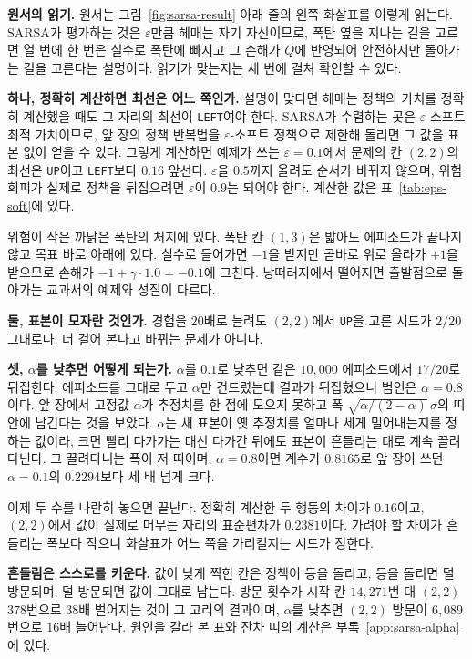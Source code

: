 \documentclass[11pt,a4paper]{article}
\begin{document}
\textbf{원서의 읽기.} 원서는 그림~\ref{fig:sarsa-result} 아래 줄의 왼쪽 화살표를 이렇게 읽는다.
SARSA가 평가하는 것은 $\varepsilon$만큼 헤매는 자기 자신이므로, 폭탄 옆을 지나는 길을 고르면 열 번에
한 번은 실수로 폭탄에 빠지고 그 손해가 $Q$에 반영되어 안전하지만 돌아가는 길을 고른다는 설명이다.
읽기가 맞는지는 세 번에 걸쳐 확인할 수 있다.

\textbf{하나, 정확히 계산하면 최선은 어느 쪽인가.} 설명이 맞다면 헤매는 정책의 가치를 정확히
계산했을 때도 그 자리의 최선이 \texttt{LEFT}여야 한다. SARSA가 수렴하는 곳은
$\varepsilon$-소프트 최적 가치이므로, 앞 장의 정책 반복법을 $\varepsilon$-소프트 정책으로 제한해
돌리면 그 값을 표본 없이 얻을 수 있다. 그렇게 계산하면 예제가 쓰는 $\varepsilon=0.1$에서 문제의 칸
$(2,2)$의 최선은 \texttt{UP}이고 \texttt{LEFT}보다 $0.16$ 앞선다. $\varepsilon$을 $0.5$까지 올려도
순서가 바뀌지 않으며, 위험 회피가 실제로 정책을 뒤집으려면 $\varepsilon$이 $0.9$는 되어야 한다.
계산한 값은 표~\ref{tab:eps-soft}에 있다.

위험이 작은 까닭은 폭탄의 처지에 있다. 폭탄 칸 $(1,3)$은 밟아도 에피소드가 끝나지 않고 목표 바로
아래에 있다. 실수로 들어가면 $-1$을 받지만 곧바로 위로 올라가 $+1$을 받으므로 손해가
$-1 + \gamma \cdot 1.0 = -0.1$에 그친다. 낭떠러지에서 떨어지면 출발점으로 돌아가는 교과서의 예제와
성질이 다르다.

\textbf{둘, 표본이 모자란 것인가.} 경험을 $20$배로 늘려도 $(2,2)$에서 \texttt{UP}을 고른 시드가
$2/20$ 그대로다. 더 걸어 본다고 바뀌는 문제가 아니다.

\textbf{셋, $\alpha$를 낮추면 어떻게 되는가.} $\alpha$를 $0.1$로 낮추면 같은 $10{,}000$
에피소드에서 $17/20$로 뒤집힌다. 에피소드를 그대로 두고 $\alpha$만 건드렸는데 결과가 뒤집혔으니
범인은 $\alpha=0.8$이다. 앞 장에서 고정값 $\alpha$가 추정치를 한 점에 모으지 못하고 폭
$\sqrt{\alpha/(2-\alpha)}\,\sigma$의 띠 안에 남긴다는 것을 보았다. $\alpha$는 새 표본이 옛 추정치를
얼마나 세게 밀어내는지를 정하는 값이라, 크면 빨리 다가가는 대신 다가간 뒤에도 표본이 흔들리는 대로
계속 끌려다닌다. 그 끌려다니는 폭이 저 띠이며, $\alpha=0.8$이면 계수가 $0.8165$로 앞 장이 쓰던
$\alpha=0.1$의 $0.2294$보다 세 배 넘게 크다.

이제 두 수를 나란히 놓으면 끝난다. 정확히 계산한 두 행동의 차이가 $0.16$이고, $(2,2)$에서 값이
실제로 머무는 자리의 표준편차가 $0.2381$이다. 가려야 할 차이가 흔들리는 폭보다 작으니 화살표가
어느 쪽을 가리킬지는 시드가 정한다.

\textbf{흔들림은 스스로를 키운다.} 값이 낮게 찍힌 칸은 정책이 등을 돌리고, 등을 돌리면 덜
방문되며, 덜 방문되면 값이 그대로 남는다. 방문 횟수가 시작 칸 $14{,}271$번 대 $(2,2)$ $378$번으로
$38$배 벌어지는 것이 그 고리의 결과이며, $\alpha$를 낮추면 $(2,2)$ 방문이 $6{,}089$번으로 $16$배
늘어난다. 원인을 갈라 본 표와 잔차 띠의 계산은 부록~\ref{app:sarsa-alpha}에 있다.
\end{document}
